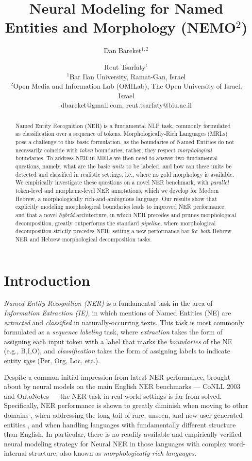 \documentclass[11pt,a4paper]{article}
\title{Neural Modeling for Named Entities and Morphology (NEMO$^2$)}
\author{
 Dan Bareket$^{1,2}$ \and Reut Tsarfaty$^1$ \\
 $^1$Bar Ilan University, Ramat-Gan, Israel\\
 $^2$Open Media and Information Lab (OMILab), The Open University of Israel, Israel\\
  {\sf dbareket@gmail.com}, {\sf reut.tsarfaty@biu.ac.il}\\
}
\date{}
\begin{document}
\maketitle
\begin{abstract}
Named Entity Recognition (NER)  is a fundamental NLP task, commonly formulated as classification over a sequence of tokens. Morphologically-Rich Languages (MRLs) pose a challenge to this basic formulation, as 
the boundaries of Named Entities do not necessarily coincide with {\em token} boundaries, rather, they respect  {\em morphological} boundaries. 
To address NER in MRLs we then need to answer two fundamental questions, namely,
what are the basic {\em units} to be labeled, and how can these units be detected and classified  in realistic settings, i.e., where no gold morphology is available.
We empirically investigate these questions on  a novel  NER benchmark, with {\em parallel} token-level and morpheme-level NER annotations, which we develop for Modern Hebrew, a morphologically rich-and-ambiguous  language. 
Our results show that 
explicitly modeling morphological boundaries  leads to improved NER performance,  and that   a novel {\em hybrid} architecture, in which NER precedes and prunes morphological decomposition, greatly outperforms the standard {\em pipeline},  where morphological decomposition  strictly precedes NER, setting a new performance bar for {\em both}  Hebrew NER and Hebrew  morphological decomposition tasks.

\end{abstract}


\section{Introduction}
\textit{Named Entity Recognition (NER)} is a fundamental task in the area of \textit{Information Extraction (IE)}, in which mentions of Named Entities (NE) 
are {\it extracted} and \textit{classified} in naturally-occurring texts.  This task is most commonly formulated as a {\em sequence labeling}   task, where  \textit{extraction}  takes the form of assigning each input token with a label that marks the {\em boundaries} of the NE (e.g., B,I,O),  and   \textit{classification} takes the form of assigning labels to  indicate   entity {\em type}   ({\sc Per, Org, Loc}, etc.). 

Despite a common initial impression from latest NER performance,  brought about by neural models on the main English NER benchmarks --- CoNLL 2003 \cite{conll2003} and OntoNotes \cite{weischedel2013ontonotes} --- the NER task in real-world settings is far from solved.
Specifically, NER performance is shown to greatly diminish when moving to other domains \cite{luan-etal-2018-multi,song2018comparison}, when addressing the long tail of rare, unseen, and new  user-generated entities \cite{derczynski-etal-2017-results}, and when handling  languages with fundamentally different structure than English.
In particular, there is no readily available and empirically verified neural modeling strategy for Neural NER in those languages with complex word-internal structure,   also known as 
{\em morphologically-rich languages}.
\end{document}
